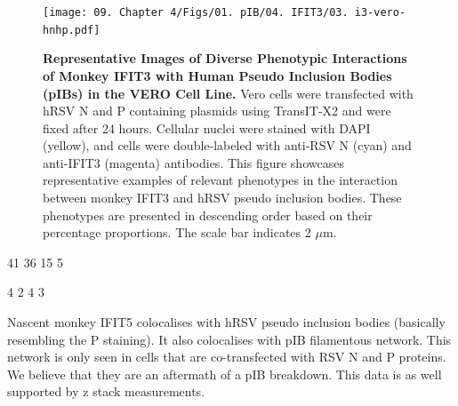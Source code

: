 \begin{figure}
    \centering
    \texttt{[image: 09. Chapter 4/Figs/01. pIB/04. IFIT3/03. i3-vero-hnhp.pdf]}
    \caption[Representative Images of Diverse Phenotypic Interactions of Monkey IFIT3 with Human Pseudo Inclusion Bodies (pIBs) in the VERO Cell Line.]{\textbf{Representative Images of Diverse Phenotypic Interactions of Monkey IFIT3 with Human Pseudo Inclusion Bodies (pIBs) in the VERO Cell Line.} Vero cells were transfected with hRSV N and P containing plasmids using TransIT-X2 and were fixed after 24 hours. Cellular nuclei were stained with DAPI (yellow), and cells were double-labeled with anti-RSV N (cyan) and anti-IFIT3 (magenta) antibodies. This figure showcases representative examples of relevant phenotypes in the interaction between monkey IFIT3 and hRSV pseudo inclusion bodies. These phenotypes are presented in descending order based on their percentage proportions. The scale bar indicates 2 \(\mu \mbox{m}\).}
    \label{fig:Representative Images of Diverse Phenotypic Interactions of Monkey IFIT3 with Human Pseudo Inclusion Bodies (pIBs) in the VERO Cell Line}
\end{figure}

41 36 15 5

4 2 4 3



Nascent monkey IFIT5 colocalises with hRSV pseudo inclusion bodies (basically resembling the P staining). It also colocalises with pIB filamentous network. This network is only seen in cells that are co-transfected with RSV N and P proteins. We believe that they are an aftermath of a pIB breakdown. This data is as well supported by z stack measurements.

